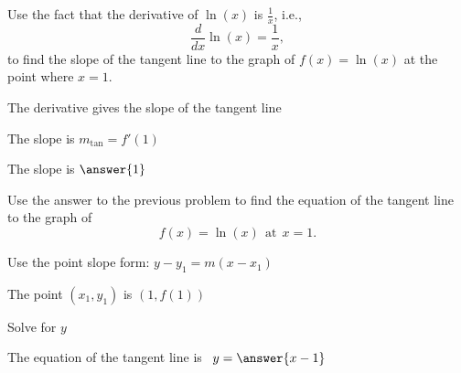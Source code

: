 \documentclass{ximera}
\begin{document}
\begin{problem} %
Use the fact that the derivative of $\ln(x)$ is $\frac{1}{x}$,
i.e., 
\[
\frac{d}{dx}\ln(x) = \frac{1}{x},
\]
to find the slope of the tangent line to the graph of 
$f(x) = \ln(x)$ at the point where $x = 1$.\\
\begin{hint}
The derivative gives the slope of the tangent line
\end{hint}
\begin{hint}
The slope is $m_{\text{tan}} = f'(1)$
\end{hint}
The slope is $\answer{1}$
\end{problem}




\begin{problem} %
Use the answer to the previous problem to find the equation of the tangent line to the graph of 
\[
f(x) = \ln(x) \ \ \text{at} \ \ x=1.
\]
\begin{hint}
Use the point slope form: $y-y_1 = m(x-x_1)$
\end{hint}
\begin{hint}
The point $(x_1,y_1)$ is $(1, f(1))$
\end{hint}
\begin{hint}
Solve for $y$
\end{hint}
The equation of the tangent line is \ $y = \answer{x-1}$
\end{problem}



\begin{center}
\begin{foldable}
\end{foldable}
\end{center}
\end{document}

